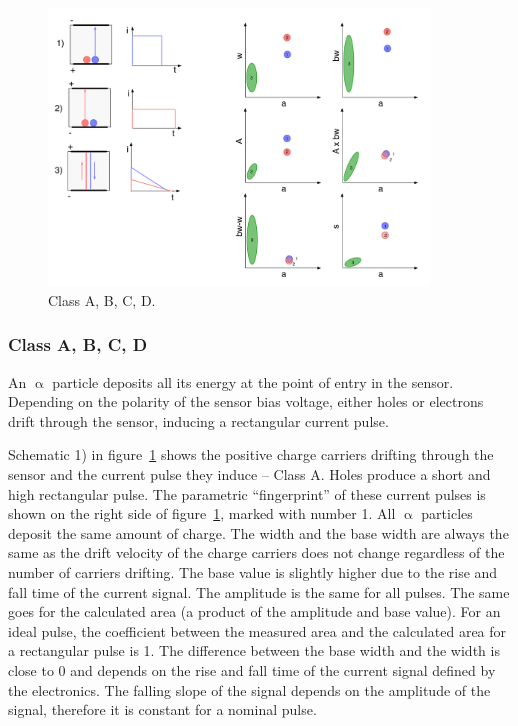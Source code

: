 \begin{figure}[!t]
\centering
\includegraphics[width=0.9\textwidth]{05_current_monitoring/plots/classABCD}
\caption{Class A, B, C, D.}
\label{fig:classabcd}
\end{figure}
\clearpage
\subsubsection{Class A, B, C, D}
\label{sec:classabcd}%
An $\upalpha$ particle deposits all its energy at the point of entry in the sensor. Depending on the polarity of the sensor bias voltage, either holes or electrons drift through the sensor, inducing a rectangular current pulse. 

Schematic 1) in figure~\ref{fig:classabcd} shows the positive charge carriers drifting through the sensor and the current pulse they induce -- Class A. Holes produce a short and high rectangular pulse. The parametric ``fingerprint'' of these current pulses is shown on the right side of figure~\ref{fig:classabcd}, marked with number 1. All $\upalpha$ particles deposit the same amount of charge.
The width and the base width are always the same as the drift velocity of the charge carriers does not change regardless of the number of carriers drifting. The base value is slightly higher due to the rise and fall time of the current signal. The amplitude is the same for all pulses. The same goes for the calculated area (a product of the amplitude and base value). For an ideal pulse, the coefficient between the measured area and the calculated area for a rectangular pulse is 1. The difference between the base width and the width is close to 0 and depends on the rise and fall time of the current signal defined by the electronics. The falling slope of the signal depends on the amplitude of the signal, therefore it is constant for a nominal pulse. 

